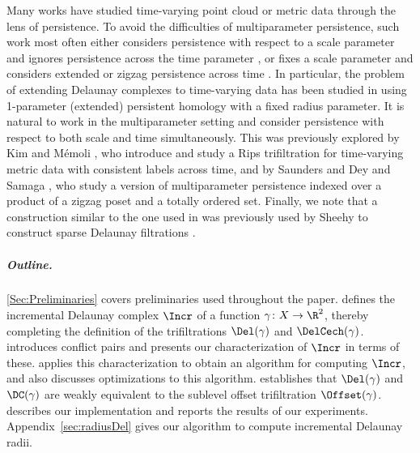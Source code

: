 %
Many works have studied time-varying point cloud or metric data through the lens of persistence.  To avoid the difficulties of multiparameter persistence, such work most often either considers persistence with respect to a scale parameter and ignores persistence across the time parameter \cite{munch2013:thesis,adams2020topological, adams:crockerplot,guzel2022detecting,morozov2008:homological, cohen2006vines}, or fixes a scale parameter and considers extended or zigzag persistence across time \cite{tymochko2020:zigzagbifurcation, kim2020analysis, kim2024extracting}.  In particular, the problem of extending Delaunay complexes to time-varying data has been studied in \cite{kerber20133d,edelsbrunner2012medusa}  using 1-parameter (extended) persistent homology with a fixed radius parameter. 
It is natural to work in the multiparameter setting and consider persistence with respect to both scale and time simultaneously.
This was previously explored by Kim and Mémoli \cite{kim2021spatiotemporal}, who introduce and study a Rips trifiltration for time-varying metric data with consistent labels across time, and by Saunders \cite{Saunders2025ZigzagPH} and Dey and Samaga \cite{dey2026quasizigzagpersistencetopological}, who study a version of multiparameter persistence %
indexed over a product of a zigzag poset and a totally ordered set.
%
Finally, we note that a construction similar to the one used in \cite{alonsoDelaunayBifiltrationsFunctions2024} was previously used by Sheehy to construct sparse Delaunay filtrations \cite{sheehy:LIPIcs.SoCG.2021.58}.  
%
\subparagraph{Outline.} 
\cref{Sec:Preliminaries} covers preliminaries used throughout the paper.    defines the incremental Delaunay complex $\Incr$ of a function $\gamma\colon X\to\R^{2}$, thereby completing the definition of the trifiltrations  $\Del(\gamma)$ and $\DelCech(\gamma)$.     introduces conflict pairs and presents our characterization of $\Incr$ in terms of these.   applies this characterization to obtain an algorithm for computing $\Incr$, and also discusses optimizations to this algorithm.   establishes that $\Del(\gamma)$ and $\DC(\gamma)$ are weakly equivalent to the sublevel offset trifiltration $\Offset(\gamma)$. 
  describes our implementation and reports the results of our experiments.  Appendix~\ref{sec:radiusDel} gives our algorithm to compute incremental Delaunay radii.  
